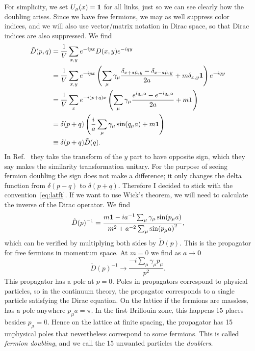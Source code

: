 For simplicity, we set $U_\mu(x)={\mathbf 1}$
for all links, just so we can see clearly how the doubling arises.
Since we have free fermions, we may as well suppress color indices,
and we will also use vector/matrix notation in Dirac space, so that
Dirac indices are also suppressed. We find
\begin{equation}\begin{aligned}
  \tilde{D}(p,q)&=\frac{1}{V}\sum_{x,y}e^{-ipx}D(x,y)e^{-iqy}\\
     &=\frac{1}{V}\sum_{x,y}e^{-ipx}\left(
      \sum_\mu\gamma_\mu\frac{\delta_{x+a\hat{\mu},y}
                             -\delta_{x-a\hat{\mu},y}}{2a}+m\delta_{x,y}{\mathbf 1}
      \right)e^{-iqy}\\
     &=\frac{1}{V}\sum_xe^{-i(p+q)x}\left(
      \sum_\mu\gamma_\mu\frac{e^{iq_\mu a}-e^{-iq_\mu a}}{2a}+m{\mathbf 1}\right)\\
     &=\delta(p+q)\left(\frac{i}{a}\sum_\mu
                    \gamma_\mu\sin(q_\mu a)+m{\mathbf 1}\right)\\
     &\equiv\delta(p+q)\tilde{D}(q).
\end{aligned}\end{equation}
In Ref.~\cite{gattringer_quantum_2010} they take the transform
of the $y$ part to have opposite sign, which they say makes the similarity
transformation unitary. For the purpose of seeing fermion doubling
the sign does not make a difference; it only changes the delta
function from $\delta(p-q)$ to $\delta(p+q)$. Therefore I decided to stick
with the convention~\eqref{eq:latft}. If we want to use Wick's theorem,
we will need to calculate the inverse of the Dirac operator. We find
\begin{equation}\label{eq:latprop}
  \tilde{D}(p)^{-1}=\frac{m{\mathbf 1}-ia^{-1}\sum_\mu\gamma_\mu\sin(p_\mu a)}
                         {m^2+a^{-2}\sum_\mu\sin(p_\mu a)^2},
\end{equation}
which can be verified by multiplying both sides by $\tilde{D}(p)$. This
is the propagator for free fermions in momentum space. At $m=0$ we find
as $a\to0$
\begin{equation}
  \tilde{D}(p)^{-1}\to\frac{-i\sum_\mu\gamma_\mu p_\mu}{p^2}.
\end{equation}
This propagator has a pole at $p=0$. Poles in propagators correspond
to physical particles, so in the continuum theory, the propagator
corresponds to a single particle satisfying the Dirac equation. On
the lattice if the fermions are massless,  has
a pole anywhere $p_\mu a=\pi$. In the first Brillouin zone, this
happens 15 places besides $p_\mu=0$. Hence on the lattice at finite
spacing, the propagator has 15 unphysical poles that nevertheless
correspond to some fermions. This is called {\it fermion doubling},
and we call the 15 unwanted particles the {\it doublers}.

